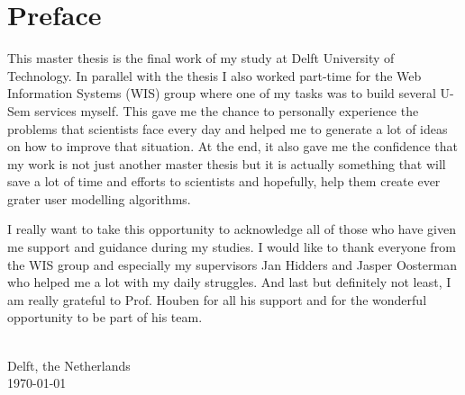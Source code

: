 
\chapter{\label{cha:Preface}Preface}

This master thesis is the final work of my study at Delft University of Technology. In parallel with the thesis I also worked part-time for the Web Information Systems (WIS) group where one of my tasks was to build several U-Sem services myself. This gave me the chance to personally experience the problems that scientists face every day and helped me to generate a lot of ideas on how to improve that situation. At the end, it also gave me the confidence that my work is not just another master thesis but it is actually something that will save a lot of time and efforts to scientists and hopefully, help them create ever grater user modelling algorithms.

I really want to take this opportunity to acknowledge all of those who have given me support and guidance during my studies. I would like to thank everyone from the WIS group and especially my supervisors Jan Hidders and Jasper Oosterman who helped me a lot with my daily struggles. And last but definitely not least, I am really grateful to Prof. Houben for all his support and for the wonderful opportunity to be part of his team.


\vskip1cm 

\begin{flushright}
\theauthor\\
 Delft, the Netherlands \\
 \today\\
 
\par\end{flushright}

